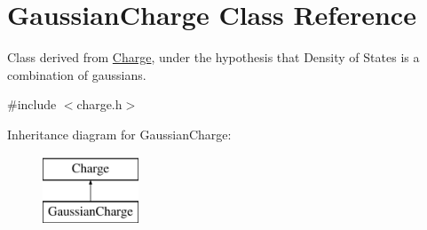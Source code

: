 \hypertarget{classGaussianCharge}{\section{Gaussian\-Charge Class Reference}
\label{classGaussianCharge}
}


Class derived from \hyperlink{classCharge}{Charge}, under the hypothesis that Density of States is a combination of gaussians.  




{\ttfamily \#include $<$charge.\-h$>$}

Inheritance diagram for Gaussian\-Charge\-:\begin{figure}[H]
\begin{center}
\leavevmode
\includegraphics[height=2.000000cm]{classGaussianCharge}
\end{center}
\end{figure}
